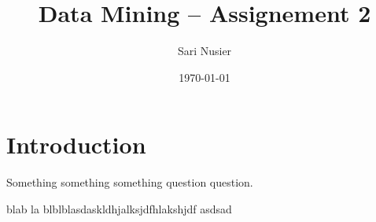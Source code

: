 \documentclass[12pt,a4paper]{article}
\begin{document}
\begin{titlepage}
	\centering
	\title{Data Mining -- Assignement 2}
	\author{Sari Nusier}
	\date{\today}
	\maketitle
\end{titlepage}
\section{Introduction}

Something something something question question.

blab la blblblasdaskldhjalksjdfhlakshjdf
asdsad
\end{document}
